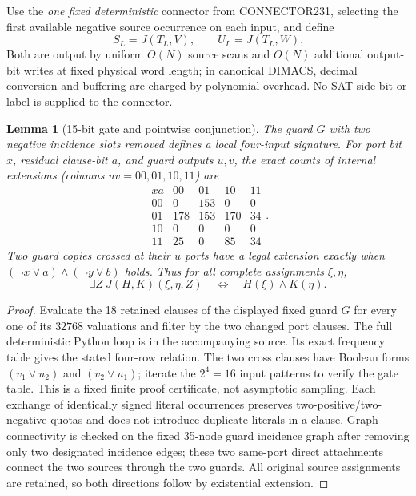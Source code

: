 \documentclass[10pt]{article}
\newtheorem{lemma}[theorem]{Lemma}
\begin{document}
Use the \emph{one fixed deterministic} connector from CONNECTOR231, selecting the first available negative source occurrence on each input, and define
\[
 S_L=J(T_L,V),\qquad U_L=J(T_L,W).
\]
Both are output by uniform $O(N)$ source scans and $O(N)$ additional output-bit writes at fixed physical word length; in canonical DIMACS, decimal conversion and buffering are charged by polynomial overhead. No SAT-side bit or label is supplied to the connector.
\begin{lemma}[15-bit gate and pointwise conjunction]\label{lem:gate}
The guard $G$ with two negative incidence slots removed defines a local four-input signature. For port bit $x$, residual clause-bit $a$, and guard outputs $u,v$, the exact counts of internal extensions (columns $uv=00,01,10,11$) are
\[
\begin{array}{c|rrrr}
xa &00&01&10&11\\\hline
00&0&153&0&0\\
01&178&153&170&34\\
10&0&0&0&0\\
11&25&0&85&34
\end{array}.
\]
Two guard copies crossed at their $u$ ports have a legal extension exactly when $(\neg x\vee a)\land(\neg y\vee b)$ holds. Thus for all complete assignments $\xi,\eta$, 
\[
\exists Z\ J(H,K)(\xi,\eta,Z)\quad\Longleftrightarrow\quad H(\xi)\land K(\eta).
\]
\end{lemma}
\begin{proof}
Evaluate the 18 retained clauses of the displayed fixed guard $G$ for every one of its $32768$ valuations and filter by the two changed port clauses. The full deterministic Python loop is in the accompanying source. Its exact frequency table gives the stated four-row relation. The two cross clauses have Boolean forms $(v_1\vee u_2)$ and $(v_2\vee u_1)$; iterate the $2^4=16$ input patterns to verify the gate table. This is a fixed finite proof certificate, not asymptotic sampling. Each exchange of identically signed literal occurrences preserves two-positive/two-negative quotas and does not introduce duplicate literals in a clause. Graph connectivity is checked on the fixed 35-node guard incidence graph after removing only two designated incidence edges; these two same-port direct attachments connect the two sources through the two guards. All original source assignments are retained, so both directions follow by existential extension.
\end{proof}
\end{document}

